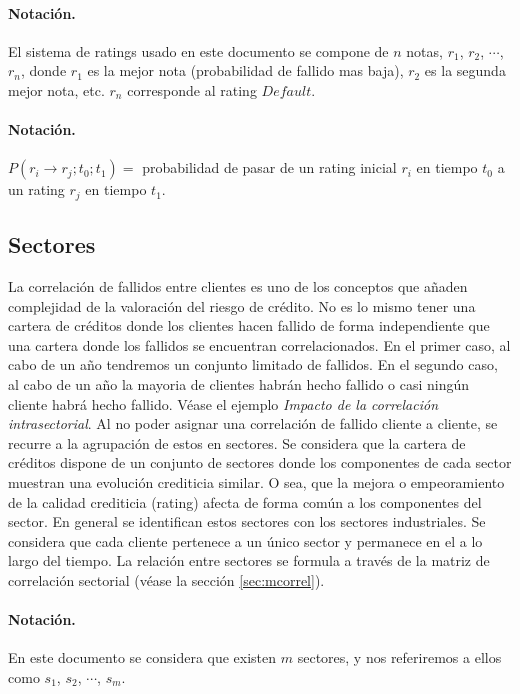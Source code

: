 \paragraph{Notaci\'on.} El sistema de ratings usado en este documento se 
compone de $n$ notas, $r_1$, $r_2$, $\cdots$, $r_n$, donde $r_1$ es la
mejor nota (probabilidad de fallido mas baja), $r_2$ es la segunda mejor nota, 
etc. $r_n$ corresponde al rating $Default$.

\paragraph{Notaci\'on.} $P(r_i \to r_j;t_0;t_1) =$ probabilidad de pasar de un 
rating inicial $r_i$ en tiempo $t_0$ a un rating $r_j$ en tiempo $t_1$.


\subsection{Sectores}

La correlaci\'on de fallidos entre clientes es uno de los conceptos que
a\~naden complejidad de la valoraci\'on del riesgo de cr\'edito. No es lo
mismo tener una cartera de cr\'editos donde los clientes hacen fallido 
de forma independiente que una cartera donde los fallidos se encuentran 
correlacionados. En el primer caso, al cabo de un a\~no tendremos un 
conjunto limitado de fallidos. En el segundo caso, al cabo de un a\~no la 
mayoria de clientes habr\'an hecho fallido o casi ning\'un cliente habr\'a
hecho fallido. V\'ease el ejemplo \emph{Impacto de la correlaci\'on intrasectorial}.
\newline
\newline
Al no poder asignar una correlaci\'on de fallido cliente a cliente, se recurre
a la agrupaci\'on de estos en sectores. Se considera que la cartera de 
cr\'editos dispone de un conjunto de sectores donde los componentes de cada 
sector muestran una evoluci\'on crediticia similar. O sea, que la mejora o 
empeoramiento de la calidad crediticia (rating) afecta de forma com\'un a los 
componentes del sector. En general se identifican estos sectores con los 
sectores industriales. 
\newline
\newline
Se considera que cada cliente pertenece a un \'unico sector y permanece en 
el a lo largo del tiempo. La relaci\'on entre sectores se formula a trav\'es 
de la matriz de correlaci\'on sectorial (v\'ease la secci\'on \ref{sec:mcorrel}).
\paragraph{Notaci\'on.} En este documento se considera que existen $m$ 
sectores, y nos referiremos a ellos como $s_1$, $s_2$, $\cdots$, $s_m$.

